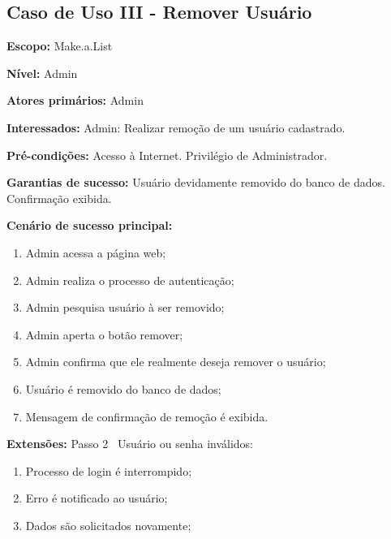 \documentclass[12pt,oneside,a4paper,article]{abntex2}
\begin{document}
		\subsection{Caso de Uso III - Remover Usuário}
				
		\textbf{Escopo:} Make.a.List 
		
		\textbf{Nível:} Admin
		
		\textbf{Atores primários:} Admin
		
		\textbf{Interessados:} Admin: Realizar remoção de um usuário cadastrado.
		
		\textbf{Pré-condições:} Acesso à Internet. Privilégio de Administrador.
		
		\textbf{Garantias de sucesso:} Usuário devidamente removido do banco de dados. Confirmação exibida.
		
		\textbf{Cenário de sucesso principal:}
		
		\begin{enumerate}
			\item Admin acessa a página web;
			
			\item Admin realiza o processo de autenticação;
			
			\item Admin pesquisa usuário à ser removido;
			
			\item Admin aperta o botão remover;
			
			\item Admin confirma que ele realmente deseja remover o usuário;
			
			\item Usuário é removido do banco de dados;
			
			\item Mensagem de confirmação de remoção é exibida.
			
		\end{enumerate}
		
		\textbf{Extensões:} Passo 2 \textrightarrow \ Usuário ou senha inválidos:
		
		\begin{enumerate}[label=\alph*.]	
			\item Processo de login é interrompido;
			\item Erro é notificado ao usuário;
			\item Dados são solicitados novamente;	
			
		\end{enumerate}
		
\end{document}
